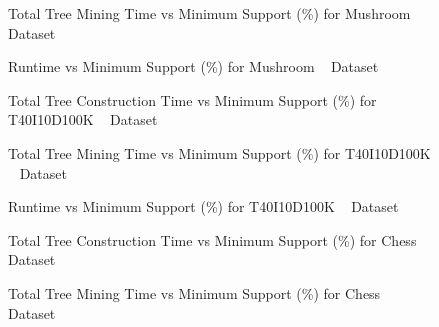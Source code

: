 \documentclass[conference]{IEEEtran}
\begin{document}
            \begin{figure}[h]
            \centering
                
            \caption{Total Tree Mining Time vs Minimum Support (\%) for Mushroom ~\cite{dataset} Dataset }
            \label{result:g_m_mining_total}
            \end{figure}
            \begin{figure}[h]
            \centering
                
            \caption{Runtime vs Minimum Support (\%) for Mushroom ~\cite{dataset} Dataset }
            \label{result:g_m_total}
            \end{figure}
            \begin{figure}[h]
            \centering
                
            \caption{Total Tree Construction Time vs Minimum Support (\%) for T40I10D100K ~\cite{dataset} Dataset }
            \label{result:g_t10_tree_construction_total}
            \end{figure}
            
            \begin{figure}[h]
            \centering
                
            \caption{Total Tree Mining Time vs Minimum Support (\%) for T40I10D100K ~\cite{dataset} Dataset }
            \label{result:g_t10_mining_total}
            \end{figure}
            
            \begin{figure}[h]
            \centering
                
            \caption{Runtime vs Minimum Support (\%) for T40I10D100K ~\cite{dataset} Dataset }
            \label{result:g_t10_total}
            \end{figure}
    
            \begin{figure}[h]
            \centering
                
            \caption{Total Tree Construction Time vs Minimum Support (\%) for Chess ~\cite{dataset} Dataset }
            \label{result:g_chess_tree_construction_total}
            \end{figure}
            
            \begin{figure}[h]
            \centering
                
            \caption{Total Tree Mining Time vs Minimum Support (\%) for Chess ~\cite{dataset} Dataset }
            \label{result:g_chess_mining_total}
            \end{figure}
            
\end{document}
